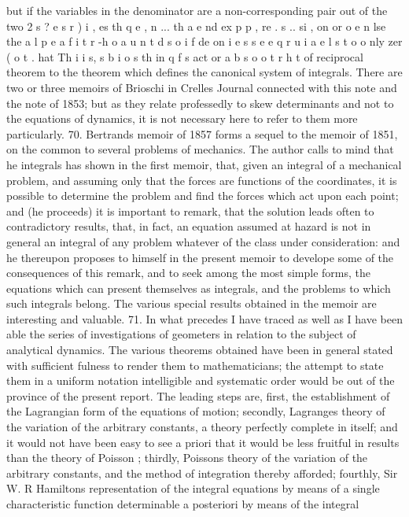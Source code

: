 \documentclass[11pt,a4paper]{book}
\begin{document}
but if the variables in the denominator are a non-corresponding pair out of the two
2 s ? e s r ) i , es th q e , n ... th a e nd ex p p , re . s .. si , on or o e n lse the a l p e a f i t r -h o a u n t d s o i f de on i e s s e e q r u i a e l s t o o nly zer ( o t . hat Th i i s, s b i o s th in q f s act or a b s o o t r h t
of reciprocal theorem to the theorem which defines the canonical system of integrals.
There are two or three memoirs of Brioschi in Crelles Journal connected with this
note and the note of 1853; but as they relate professedly to skew determinants and
not to the equations of dynamics, it is not necessary here to refer to them more
particularly.
70. Bertrands memoir of 1857 forms a sequel to the memoir of 1851, on the
common to several problems of mechanics. The author calls to mind that he
integrals
has shown in the first memoir, that, given an integral of a mechanical problem, and
assuming only that the forces are functions of the coordinates, it is possible to determine
the problem and find the forces which act upon each point; and (he proceeds) it is
important to remark, that the solution leads often to contradictory results, that, in
fact, an equation assumed at hazard is not in general an integral of any problem
whatever of the class under consideration: and he thereupon proposes to himself in
the present memoir to develope some of the consequences of this remark, and to
seek among the most simple forms, the equations which can present themselves as
integrals, and the problems to which such integrals belong. The various special results
obtained in the memoir are interesting and valuable.
71. In what precedes I have traced as well as I have been able the series of
investigations of geometers in relation to the subject of analytical dynamics. The
various theorems obtained have been in general stated with sufficient fulness to render
them to mathematicians; the attempt to state them in a uniform notation
intelligible
and systematic order would be out of the province of the present report. The leading
steps are, first, the establishment of the Lagrangian form of the equations of motion;
secondly, Lagranges theory of the variation of the arbitrary constants, a theory perfectly
complete in itself; and it would not have been easy to see a priori that it would be
less fruitful in results than the theory of Poisson ; thirdly, Poissons theory of the
variation of the arbitrary constants, and the method of integration thereby afforded;
fourthly, Sir W. R Hamiltons representation of the integral equations by means of
a single characteristic function determinable a posteriori by means of the integral
\end{document}
